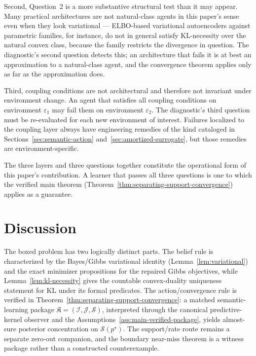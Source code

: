 \documentclass[11pt]{article}
\theoremstyle{definition}
\theoremstyle{remark}
\theoremstyle{plain}
\theoremstyle{definition}
\newcommand{\Scal}{\mathcal{S}}
\begin{document}
Second, Question~2 is a more substantive structural test than it may appear. Many practical architectures are not natural-class agents in this paper's sense even when they look variational --- ELBO-based variational autoencoders against parametric families, for instance, do not in general satisfy KL-necessity over the natural convex class, because the family restricts the divergence in question. The diagnostic's second question detects this; an architecture that fails it is at best an approximation to a natural-class agent, and the convergence theorem applies only as far as the approximation does.

Third, coupling conditions are not architectural and therefore not invariant under environment change. An agent that satisfies all coupling conditions on environment $\varepsilon_1$ may fail them on environment $\varepsilon_2$. The diagnostic's third question must be re-evaluated for each new environment of interest. Failures localized to the coupling layer always have engineering remedies of the kind cataloged in Sections~\ref{sec:semantic-action} and~\ref{sec:amortized-surrogate}, but those remedies are environment-specific.

The three layers and three questions together constitute the operational form of this paper's contribution. A learner that passes all three questions is one to which the verified main theorem (Theorem~\ref{thm:separating-support-convergence}) applies as a guarantee.


\section{Discussion}
\label{sec:discussion}

The boxed problem has two logically distinct parts. The belief rule is characterized by the Bayes/Gibbs variational identity (Lemma~\ref{lem:variational}) and the exact minimizer propositions for the repaired Gibbs objectives, while Lemma~\ref{lem:kl-necessity} gives the countable convex-duality uniqueness statement for KL under its formal predicates. The action/convergence rule is verified in Theorem~\ref{thm:separating-support-convergence}: a matched semantic-learning package $\mathfrak K=(\mathcal I,\mathcal J,\Scal)$, interpreted through the canonical predictive-kernel observer and the Assumptions~\ref{ass:main-verified-package}, yields almost-sure posterior concentration on $\Scal(p^\star)$. The support/rate route remains a separate zero-out companion, and the boundary near-miss theorem is a witness package rather than a constructed counterexample.
\end{document}
